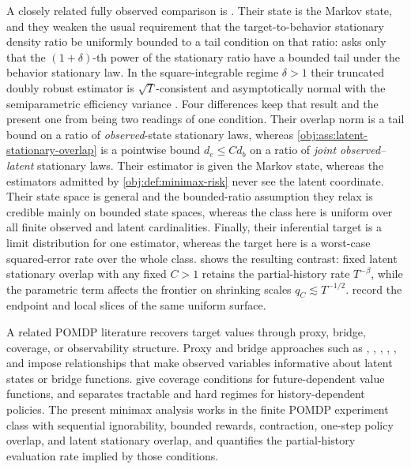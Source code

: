 A closely related fully observed comparison is \citet{MehrabiWager2025}. Their state is the Markov state, and they weaken the usual requirement that the target-to-behavior stationary density ratio be uniformly bounded to a tail condition on that ratio: \citet[Definition 1]{MehrabiWager2025} asks only that the \((1+\delta)\)-th power of the stationary ratio have a bounded tail under the behavior stationary law. In the square-integrable regime \(\delta>1\) their truncated doubly robust estimator is \(\sqrt T\)-consistent and asymptotically normal with the semiparametric efficiency variance \citep[Theorem 3.4]{MehrabiWager2025}. Four differences keep that result and the present one from being two readings of one condition. Their overlap norm is a tail bound on a ratio of \emph{observed}-state stationary laws, whereas \cref{obj:ass:latent-stationary-overlap} is a pointwise bound \(d_e\le Cd_b\) on a ratio of \emph{joint observed--latent} stationary laws. Their estimator is given the Markov state, whereas the estimators admitted by \cref{obj:def:minimax-risk} never see the latent coordinate. Their state space is general and the bounded-ratio assumption they relax is credible mainly on bounded state spaces, whereas the class here is uniform over all finite observed and latent cardinalities. Finally, their inferential target is a limit distribution for one estimator, whereas the target here is a worst-case squared-error rate over the whole class.  shows the resulting contrast: fixed latent stationary overlap with any fixed \(C>1\) retains the partial-history rate \(T^{-\beta}\), while the parametric term affects the frontier on shrinking scales \(q_C\lesssim T^{-1/2}\).  record the endpoint and local slices of the same uniform surface.

A related POMDP literature recovers target values through proxy, bridge, coverage, or observability structure. Proxy and bridge approaches such as \citet{TennenholtzShalitMannor2020}, \citet{Bennett2021}, \citet{Miao2022}, \citet{Shi2022}, \citet{Uehara2023}, and \citet{Kuang2025} impose relationships that make observed variables informative about latent states or bridge functions.  give coverage conditions for future-dependent value functions, and \citet{Zhang2025} separates tractable and hard regimes for history-dependent policies. The present minimax analysis works in the finite POMDP experiment class with sequential ignorability, bounded rewards, contraction, one-step policy overlap, and latent stationary overlap, and quantifies the partial-history evaluation rate implied by those conditions.

